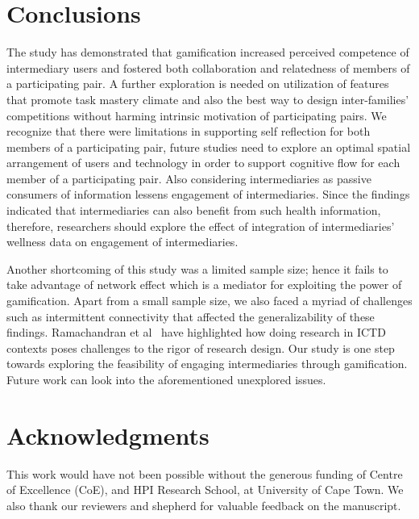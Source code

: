\documentclass{sig-alternate}
\begin{document}
\section{Conclusions}
The study has demonstrated that gamification increased perceived competence of intermediary users and fostered both collaboration and relatedness of members of a participating pair. A further exploration is needed on utilization of features that promote task mastery climate and also the best way to design inter-families' competitions without harming intrinsic motivation of participating pairs. We recognize that there were limitations in supporting self reflection for both members of a participating pair, future studies need to explore an optimal spatial arrangement of users and technology in order to support cognitive flow for each member of a participating pair. Also considering intermediaries as passive consumers of information lessens engagement of intermediaries.  Since the findings indicated that intermediaries can also benefit from such health information, therefore, researchers should explore the effect of integration of intermediaries' wellness data on engagement of intermediaries.

Another shortcoming of this study was a limited sample size; hence it fails to take advantage of network effect which is a mediator for exploiting the power of gamification. Apart from a small sample size, we also faced a myriad of challenges such as intermittent connectivity that affected the generalizability of these findings. Ramachandran et al~\cite{ramachandran2010research} have highlighted how doing research in ICTD contexts poses challenges to the rigor of research design. Our study is one step towards exploring the feasibility of engaging intermediaries through gamification. Future work can look into the aforementioned unexplored issues. 

\section{Acknowledgments} 
This work would have not been possible without the generous funding of Centre of Excellence (CoE), and HPI Research School, at University of Cape Town.  We also thank our reviewers and shepherd for valuable feedback on the manuscript.


%

%
%
\end{document}
